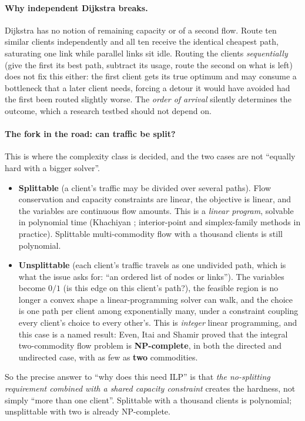 \documentclass[11pt,a4paper]{article}
\begin{document}
\paragraph{Why independent Dijkstra breaks.}
Dijkstra has no notion of remaining capacity or of a second flow. Route ten similar clients independently and all ten receive
the identical cheapest path, saturating one link while parallel links sit idle. Routing the clients \emph{sequentially} (give the first its best
path, subtract its usage, route the second on what is left) does not fix this either: the first client gets its true optimum and may
consume a bottleneck that a later client needs, forcing a detour it would have avoided had the first been routed slightly worse. The
\emph{order of arrival} silently determines the outcome, which a research testbed should not depend on.

\paragraph{The fork in the road: can traffic be split?}
This is where the complexity class is decided, and the two cases are not ``equally hard with a bigger solver''.
\begin{itemize}
  \item \textbf{Splittable} (a client's traffic may be divided over several paths). Flow conservation and capacity constraints are
        linear, the objective is linear, and the variables are continuous flow amounts. This is a \emph{linear program}, solvable in
        polynomial time (Khachiyan \cite{khachiyan1979}; interior-point and simplex-family methods in practice). Splittable
        multi-commodity flow with a thousand clients is still polynomial.
  \item \textbf{Unsplittable} (each client's traffic travels as one undivided path, which is what the issue asks for: ``an ordered list of
        nodes or links''). The variables become $0/1$ (is this edge on this client's path?), the feasible region is no longer a convex shape a
        linear-programming solver can walk, and the choice is one path per client among exponentially many, under a constraint coupling every
        client's choice to every other's. This is \emph{integer} linear programming, and this case is a named result: Even, Itai and
        Shamir \cite{even1976} proved that the integral two-commodity flow problem is \textbf{NP-complete}, in both the directed and
        undirected case, with as few as \textbf{two} commodities.
\end{itemize}
So the precise answer to ``why does this need ILP'' is that \emph{the no-splitting requirement combined with a shared capacity constraint}
creates the hardness, not simply ``more than one client''. Splittable with a thousand clients is polynomial; unsplittable with two is already
NP-complete.
\end{document}
